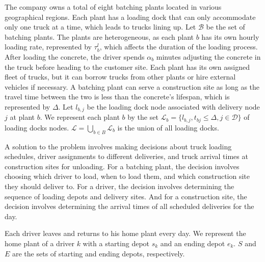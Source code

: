 \documentclass{article}
\begin{document}

The company owns a total of eight batching plants located in various geographical regions. Each plant has a loading dock that can only accommodate only one truck at a time, which leads to trucks lining up. Let $\mathcal{B}$ be the set of batching plants. The plants are heterogeneous, as each plant $b$ has its own hourly loading rate, represented by $\tau^l_b$, which affects the duration of the loading process. After loading the concrete, the driver spends $\alpha_b$ minutes adjusting the concrete in the truck before heading to the customer site. Each plant has its own assigned fleet of trucks, but it can borrow trucks from other plants or hire external vehicles if necessary.  A batching plant can serve a construction site as long as the travel time between the two is less than the concrete's lifespan, which is represented by $\Delta$. Let $l_{b,j}$ be the loading dock node associated with delivery node $j$ at plant $b$.
We represent each plant $b$ by the set $\mathcal{L}_b = \{l_{b,j}, t_{bj}\leq  \Delta, j \in \mathcal{D} \}$  of loading docks nodes. $\mathcal{L}=\bigcup_{b\in B} \mathcal{L}_b$ is the union of all loading docks. 

A solution to the problem involves making decisions about truck loading schedules, driver assignments to different deliveries, and truck arrival times at construction sites for unloading. For a batching plant, the decision involves choosing which driver to load, when to load them, and which construction site they should deliver to. For a driver, the decision involves determining the sequence of loading depots and delivery sites. And for a construction site, the decision involves determining the arrival times of all scheduled deliveries for the day.

Each driver leaves and returns to his home plant every day. We represent the home plant of a driver $k$ with a starting depot $s_k$ and an ending depot $e_k$. $S$ and $E$ are the sets of starting and ending depots, respectively.
\end{document}
